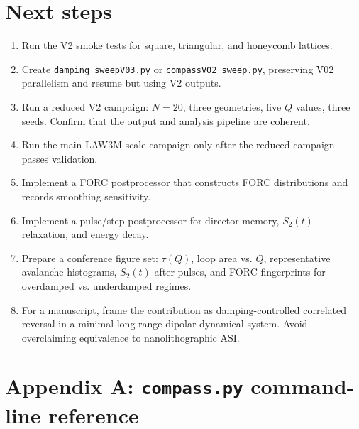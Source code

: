 \documentclass[11pt,a4paper]{article}
\newcommand{\code}[1]{\texttt{#1}}
\begin{document}
\section{Next steps}
\label{sec:next}

\begin{enumerate}[leftmargin=*]
\item Run the V2 smoke tests for square, triangular, and honeycomb lattices.
\item Create \code{damping\_sweepV03.py} or \code{compassV02\_sweep.py}, preserving V02 parallelism and resume but using V2 outputs.
\item Run a reduced V2 campaign: $N=20$, three geometries, five $Q$ values, three seeds. Confirm that the output and analysis pipeline are coherent.
\item Run the main LAW3M-scale campaign only after the reduced campaign passes validation.
\item Implement a FORC postprocessor that constructs FORC distributions and records smoothing sensitivity.
\item Implement a pulse/step postprocessor for director memory, $S_2(t)$ relaxation, and energy decay.
\item Prepare a conference figure set: $\tau(Q)$, loop area vs. $Q$, representative avalanche histograms, $S_2(t)$ after pulses, and FORC fingerprints for overdamped vs. underdamped regimes.
\item For a manuscript, frame the contribution as damping-controlled correlated reversal in a minimal long-range dipolar dynamical system. Avoid overclaiming equivalence to nanolithographic ASI.
\end{enumerate}

\section{Appendix A: \code{compass.py} command-line reference}
\label{app:cli}
\end{document}
